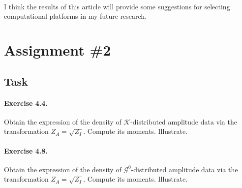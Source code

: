 \documentclass{article}
\begin{document}
\\
I think the results of this article will provide some suggestions for selecting computational platforms in my future research.

\section*{Assignment \#2}
\subsection*{Task}
\paragraph{Exercise 4.4.} Obtain the expression of the density of $\mathcal K$-distributed
amplitude data via the transformation $Z_{A} = \sqrt{Z_{I}}$. Compute its moments.
Illustrate.
\paragraph{Exercise 4.8.} Obtain the expression of the density of $\mathcal G^{0}$-distributed amplitude data via the transformation $Z_{A} = \sqrt{Z_{I}}$. Compute its moments.
Illustrate.
\end{document}
